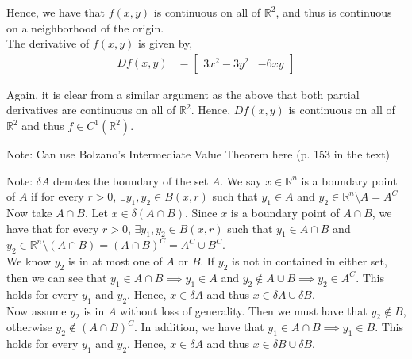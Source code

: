 \documentclass[12pt]{article}
\newenvironment{problem}[2][Problem]{\begin{trivlist}
\item[\hskip \labelsep {\bfseries #1}\hskip \labelsep {\bfseries #2.}]}{\end{trivlist}}
\begin{document}
Hence, we have that $f(x, y)$ is continuous on all of $\mathbb{R}^2$, and thus is continuous on a neighborhood of the origin.\\

The derivative of $f(x,y)$ is given by,
\begin{align*}
Df(x,y) &= \begin{bmatrix}
3x^2 - 3y^2 & -6xy
\end{bmatrix}
\end{align*}

Again, it is clear from a similar argument as the above that both partial derivatives are continuous on all of $\mathbb{R}^2$. Hence, $Df(x,y)$ is continuous on all of $\mathbb{R}^2$ and thus $f \in C^1(\mathbb{R}^2)$.

\begin{problem}{5}
\end{problem}

Note: Can use Bolzano's Intermediate Value Theorem here (p. 153 in the text)

\begin{problem}{6}
\end{problem}

Note: $\delta A$ denotes the boundary of the set $A$. We say $x \in \mathbb{R}^n$ is a boundary point of $A$ if for every $r > 0$, $\exists y_1, y_2 \in B(x, r)$ such that $y_1 \in A$ and $y_2 \in \mathbb{R}^n \setminus A = A^C$\\

Now take $A \cap B$. Let $x \in \delta(A \cap B)$. Since $x$ is a boundary point of $A \cap B$, we have that for every $r > 0$, $\exists y_1, y_2 \in B(x, r)$ such that $y_1 \in A \cap B$ and $y_2 \in \mathbb{R}^n \setminus (A \cap B) = (A \cap B)^C = A^C \cup B^C$.\\

We know $y_2$ is in at most one of $A$ or $B$. If $y_2$ is not in contained in either set, then we can see that $y_1 \in A \cap B \implies y_1 \in A$ and $y_2 \not\in A \cup B \implies y_2 \in A^C$. This holds for every $y_1$ and $y_2$. Hence, $x \in \delta A$ and thus $x \in \delta A \cup \delta B$.\\

Now assume $y_2$ is in $A$ without loss of generality. Then we must have that $y_2 \not\in B$, otherwise $y_2 \not\in (A \cap B)^C$. In addition, we have that $y_1 \in A \cap B \implies y_1 \in B$. This holds for every $y_1$ and $y_2$. Hence, $x \in \delta A$ and thus $x \in \delta B \cup \delta B$.\\
\end{document}
